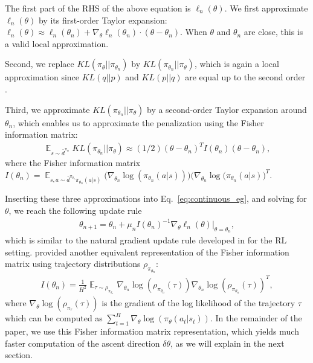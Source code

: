 \documentclass{article}
\newcommand{\BB}[1]{\textcolor{red}{\bf Byron: {#1}}}
\begin{document}
The first part of the RHS of the above equation is $\ell_n(\theta)$. We first approximate $\ell_n(\theta)$ by its first-order Taylor expansion: $\ell_n(\theta)\approx \ell_n(\theta_n) + \nabla_{\theta}\ell_n(\theta_n) \cdot (\theta - \theta_n)$. When $\theta$ and $\theta_n$ are close, this is a valid local approximation. 

Second, we replace $KL(\pi_{\theta}||\pi_{\theta_n})$ by $KL(\pi_{\theta_n}||\pi_{\theta})$, which is again a local approximation since $KL(q||p)$ and $KL(p||q)$ are equal up to the second order \cite{kakade2002approximately,schulman2015trust}.

Third, we approximate $KL(\pi_{\theta_n}||\pi_{\theta})$ by a second-order Taylor expansion around $\theta_n$, which enables us to approximate the penalization using the Fisher information matrix:
\begin{align}
\mathop{\mathbb{E}}_{s\sim\bar{d}^{\pi_n}}KL(\pi_{\theta_n} || \pi_{\theta}) \approx (1/2)(\theta - \theta_n)^T I(\theta_n)(\theta-\theta_n), \nonumber
\end{align} where the Fisher information matrix $I(\theta_n)=\mathop{\mathbb{E}}_{s,a\sim \bar{d}^{\pi_{\theta_n}}\pi_{\theta_n}(a|s)}\big(\nabla_{\theta_n}\log(\pi_{\theta_n}(a|s))\big)\big(\nabla_{\theta_n}\log(\pi_{\theta_n}(a|s)\big)^T$. 

Inserting these three approximations into Eq.~\ref{eq:continuous_eg}, and solving for $\theta$, we reach the following update rule
\begin{align}
\theta_{n+1} = \theta_n + \mu_{n}I(\theta_n)^{-1}\nabla_{\theta}\ell_n(\theta)|_{\theta =\theta_n},
\end{align} which is similar to the natural gradient update rule developed in \cite{kakade2002natural} %
for the RL setting. 
\citet{bagnell2003covariant} provided another equivalent representation of the Fisher information matrix using trajectory distributions $\rho_{\pi_{\theta_n}}$:
\begin{align}
\label{eq:fisher_traj}
I(\theta_n) = \frac{1}{H^2}\mathop{\mathop{\mathbb{E}}}_{\tau\sim \rho_{\pi_{\theta_n}}}\nabla_{\theta_n}\log(\rho_{\pi_{\theta_n}}(\tau))\nabla_{\theta_n}\log(\rho_{\pi_{\theta_n}}(\tau))^T,
\end{align} where $\nabla_{\theta}\log(\rho_{\pi_{\tau}}(\tau))$ is the gradient of the log likelihood of the trajectory $\tau$which can be computed as $\sum_{t=1}^H\nabla_{\theta}\log(\pi_{\theta}(a_t|s_t))$. In the remainder of the paper, we use this Fisher information matrix representation, which yields much faster computation of the ascent direction $\delta\theta$, as we will explain in the next section.
\end{document}
